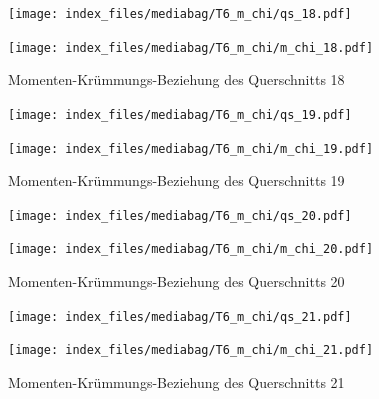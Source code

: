 \documentclass[
  11pt,
  letterpaper,
]{scrreprt}
\begin{document}
\begin{figure}[H]

\begin{minipage}{0.50\linewidth}
\texttt{[image: index\_files/mediabag/T6\_m\_chi/qs\_18.pdf]}\end{minipage}%
%
\begin{minipage}{0.50\linewidth}
\texttt{[image: index\_files/mediabag/T6\_m\_chi/m\_chi\_18.pdf]}\end{minipage}%

\caption{\label{fig-mchi_anhang}Momenten-Krümmungs-Beziehung des
Querschnitts 18}

\end{figure}%

\begin{figure}[H]

\begin{minipage}{0.50\linewidth}
\texttt{[image: index\_files/mediabag/T6\_m\_chi/qs\_19.pdf]}\end{minipage}%
%
\begin{minipage}{0.50\linewidth}
\texttt{[image: index\_files/mediabag/T6\_m\_chi/m\_chi\_19.pdf]}\end{minipage}%

\caption{\label{fig-mchi_anhang}Momenten-Krümmungs-Beziehung des
Querschnitts 19}

\end{figure}%

\begin{figure}[H]

\begin{minipage}{0.50\linewidth}
\texttt{[image: index\_files/mediabag/T6\_m\_chi/qs\_20.pdf]}\end{minipage}%
%
\begin{minipage}{0.50\linewidth}
\texttt{[image: index\_files/mediabag/T6\_m\_chi/m\_chi\_20.pdf]}\end{minipage}%

\caption{\label{fig-mchi_anhang}Momenten-Krümmungs-Beziehung des
Querschnitts 20}

\end{figure}%

\begin{figure}[H]

\begin{minipage}{0.50\linewidth}
\texttt{[image: index\_files/mediabag/T6\_m\_chi/qs\_21.pdf]}\end{minipage}%
%
\begin{minipage}{0.50\linewidth}
\texttt{[image: index\_files/mediabag/T6\_m\_chi/m\_chi\_21.pdf]}\end{minipage}%

\caption{\label{fig-mchi_anhang}Momenten-Krümmungs-Beziehung des
Querschnitts 21}

\end{figure}%
\end{document}
